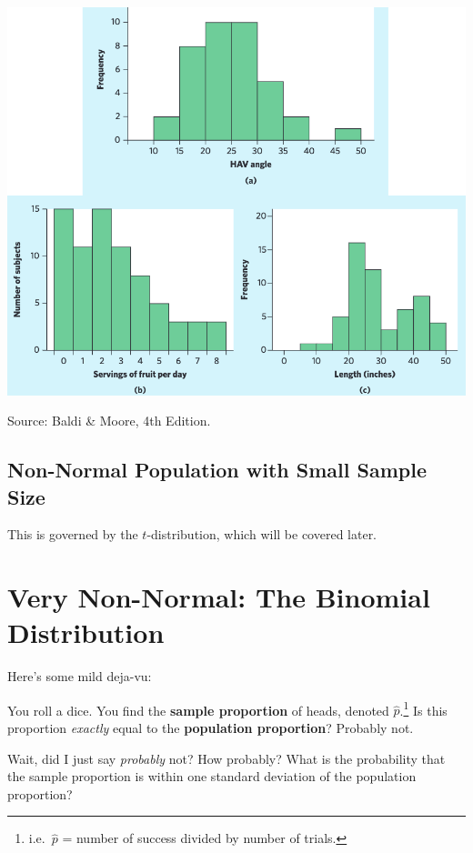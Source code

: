 \documentclass[
  letterpaper,
  DIV=11,
  numbers=noendperiod]{scrreprt}
\begin{document}
\includegraphics[width=\textwidth]{figs/sampling_dist_examples.png}

Source: Baldi \& Moore, 4th Edition.

\hypertarget{non-normal-population-with-small-sample-size}{%
\section{Non-Normal Population with Small Sample
Size}\label{non-normal-population-with-small-sample-size}}

This is governed by the \(t\)-distribution, which will be covered later.

\hypertarget{very-non-normal-the-binomial-distribution}{%
\chapter{Very Non-Normal: The Binomial
Distribution}\label{very-non-normal-the-binomial-distribution}}

Here's some mild deja-vu:

You roll a dice. You find the \textbf{sample proportion} of heads,
denoted \(\hat p\).\footnote{i.e.~\(\hat p\) = number of success divided
  by number of trials.} Is this proportion \emph{exactly} equal to the
\textbf{population proportion}? Probably not.

Wait, did I just say \emph{probably} not? How probably? What is the
probability that the sample proportion is within one standard deviation
of the population proportion?
\end{document}
